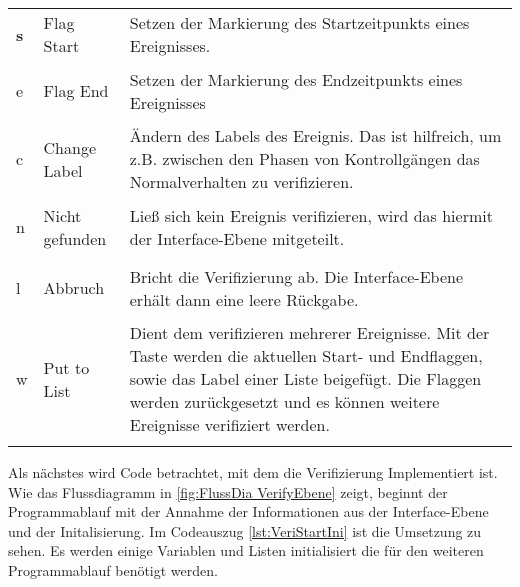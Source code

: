 \begin{longtable}{>{\bfseries} p{} p{} p{}}
s & Flag Start & Setzen der Markierung des Startzeitpunkts eines Ereignisses. \\
\addlinespace[0.7em] %

e & Flag End &  Setzen der Markierung des Endzeitpunkts eines Ereignisses \\
\addlinespace[0.7em] %

c & Change Label & Ändern des Labels des Ereignis. Das ist hilfreich, um z.B. zwischen den Phasen von Kontrollgängen das Normalverhalten zu verifizieren. \\
\addlinespace[0.7em] %

n & Nicht gefunden & Ließ sich kein Ereignis verifizieren, wird das hiermit der Interface-Ebene mitgeteilt. \\
\addlinespace[0.7em] %

l & Abbruch & Bricht die Verifizierung ab. Die Interface-Ebene erhält dann eine leere Rückgabe. \\
\addlinespace[0.7em] %

w & Put to List & Dient dem verifizieren mehrerer Ereignisse. Mit der Taste werden die aktuellen Start- und Endflaggen, sowie das Label einer Liste beigefügt. Die Flaggen werden zurückgesetzt und es können weitere Ereignisse verifiziert werden.\\
\addlinespace[0.7em] %

\end{longtable}

Als nächstes wird Code betrachtet, mit dem die Verifizierung Implementiert ist. Wie das Flussdiagramm in \ref{fig:FlussDia VerifyEbene} zeigt, beginnt der Programmablauf mit der Annahme der Informationen aus der Interface-Ebene und der Initalisierung. Im Codeauszug \ref{lst:VeriStartIni} ist die Umsetzung zu sehen. Es werden einige Variablen und Listen initialisiert die für den weiteren Programmablauf benötigt werden.

